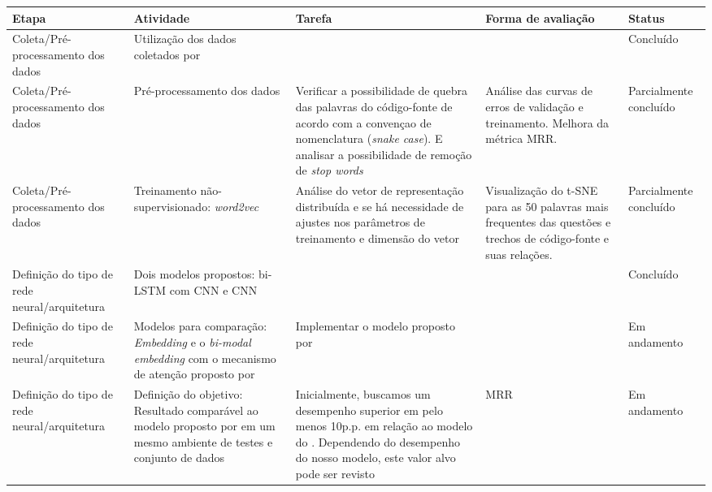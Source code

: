 {\footnotesize
\centering
\begin{longtable}{ p{8em} p{8em} p{10em} p{8em} p{6em} }
\hline
\textbf{Etapa} & \textbf{Atividade} & \textbf{Tarefa} & \textbf{Forma de avaliação} & \textbf{Status} \\
\hline
Coleta/Pré-processamento dos dados & Utilização dos dados coletados por \cite{yao-2018} & & & Concluído  \\
\hline

Coleta/Pré-processamento dos dados & Pré-processamento dos dados & Verificar a possibilidade de quebra das palavras do código-fonte de acordo com a convençao de nomenclatura (\textit{snake case}). E analisar a possibilidade de remoção de \textit{stop words} & Análise das curvas de erros de validação e treinamento. Melhora da métrica MRR. & Parcialmente concluído  \\
\hline

Coleta/Pré-processamento dos dados & Treinamento não-supervisionado: \textit{word2vec} & Análise do vetor de representação distribuída e se há necessidade de ajustes nos parâmetros de treinamento e dimensão do vetor & Visualização do t-SNE para as 50 palavras mais frequentes das questões e trechos de código-fonte e suas relações. & Parcialmente concluído  \\
\hline

Definição do tipo de rede neural/arquitetura & Dois modelos propostos: bi-LSTM com CNN e CNN & & & Concluído  \\
\hline

Definição do tipo de rede neural/arquitetura & Modelos para comparação: \textit{Embedding} e o \textit{bi-modal embedding} com o mecanismo de atenção proposto por \cite{cambronero-deep-learning-code-search:2019} & Implementar o modelo proposto por \cite{cambronero-deep-learning-code-search:2019} & & Em andamento  \\
\hline

Definição do tipo de rede neural/arquitetura & Definição do objetivo: Resultado comparável ao modelo proposto por \cite{cambronero-deep-learning-code-search:2019} em um mesmo ambiente de testes e conjunto de dados & Inicialmente, buscamos um desempenho superior em pelo menos 10p.p. em relação ao modelo do \cite{cambronero-deep-learning-code-search:2019}. Dependendo do desempenho do nosso modelo, este valor alvo pode ser revisto & MRR & Em andamento  \\
\hline


\end{longtable}}
